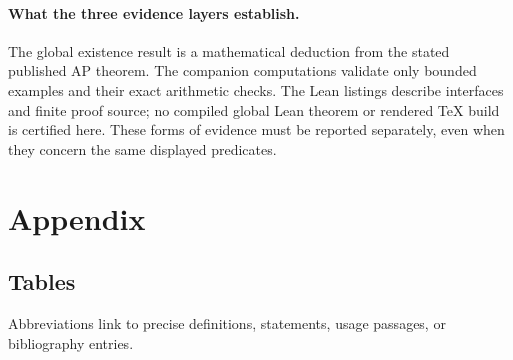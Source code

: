 \documentclass[11pt,reqno]{amsart}
\theoremstyle{blueplain}
\numberwithin{equation}{section}
\def\hyperlink#1#2{#2}}
\begin{document}
\paragraph{What the three evidence layers establish.}
The global existence result is a mathematical deduction from the stated
published \hyperlink{term:AP}{AP} theorem. The companion computations validate only bounded
examples and their exact arithmetic checks. The Lean listings describe
interfaces and finite proof source; no compiled global Lean theorem or
rendered TeX build is certified here. These forms of evidence must be
reported separately, even when they concern the same displayed predicates.

\section{Appendix}\label{sec:appendix}
\subsection{Tables}\label{sec:appendix-tables}

Abbreviations link to precise definitions, statements, usage passages, or bibliography entries.
\end{document}

